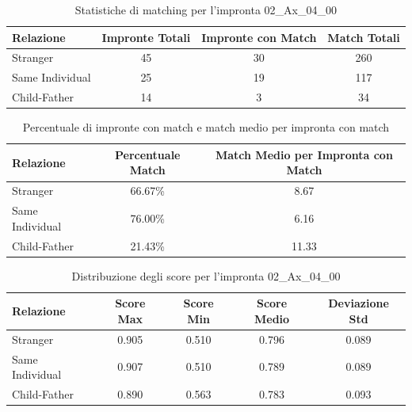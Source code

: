 \begin{table}[htbp]
\centering
\caption{Statistiche di matching per l'impronta 02\_Ax\_04\_00}
\label{tab:results_02_Ax_04_00}
\begin{tabular}{|l|c|c|c|}
\hline
\textbf{Relazione} & \textbf{Impronte Totali} & \textbf{Impronte con Match} & \textbf{Match Totali} \\
\hline
Stranger & 45 & 30 & 260 \\
\hline
Same Individual & 25 & 19 & 117 \\
\hline
Child-Father & 14 & 3 & 34 \\
\hline
\end{tabular}
\end{table}


\begin{table}[htbp]
\centering
\caption{Percentuale di impronte con match e match medio per impronta con match}
\label{tab:match_percentage_02_Ax_04_00}
\begin{tabular}{|l|c|c|}
\hline
\textbf{Relazione} & \textbf{Percentuale Match} & \textbf{Match Medio per Impronta con Match} \\
\hline
Stranger & 66.67\% & 8.67 \\
\hline
Same Individual & 76.00\% & 6.16 \\
\hline
Child-Father & 21.43\% & 11.33 \\
\hline
\end{tabular}
\end{table}


\begin{table}[htbp]
\centering
\caption{Distribuzione degli score per l'impronta 02\_Ax\_04\_00}
\label{tab:scores_02_Ax_04_00}
\begin{tabular}{|l|c|c|c|c|}
\hline
\textbf{Relazione} & \textbf{Score Max} & \textbf{Score Min} & \textbf{Score Medio} & \textbf{Deviazione Std} \\
\hline
Stranger & 0.905 & 0.510 & 0.796 & 0.089 \\
\hline
Same Individual & 0.907 & 0.510 & 0.789 & 0.089 \\
\hline
Child-Father & 0.890 & 0.563 & 0.783 & 0.093 \\
\hline
\end{tabular}
\end{table}

